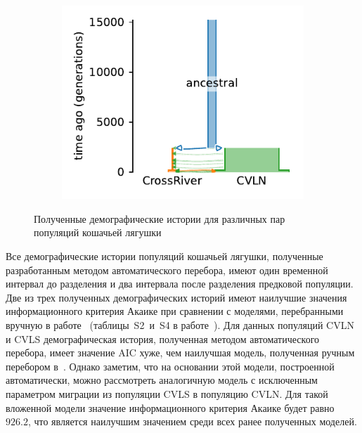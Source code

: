 \begin{figure}[ht]
\begin{subfigure}[b]{.33\textwidth}
    \end{subfigure}%
    \begin{subfigure}[b]{.33\textwidth}
    \includegraphics[width=\textwidth]{images_experiments/gaboon_forest_frog/auto/picture_1pop_model_cross_cvln.pdf}
    \label{fig:part3:experiments:frog:results_3}
    \end{subfigure}
    \caption{Полученные демографические истории для  различных пар популяций кошачьей лягушки}
    \label{fig:part3:experiments:frog:results}
\end{figure}

Все демографические истории популяций кошачьей лягушки, полученные разработанным методом автоматического перебора, имеют один временной интервал до разделения и два интервала после разделения предковой популяции.
Две из трех полученных демографических историй имеют наилучшие значения информационного критерия Акаике при сравнении с моделями, перебранными вручную в работе~\cite{portik2017evaluating} (таблицы~S2~и~S4 в работе~\cite{noskova2020gadma}).
Для данных популяций CVLN и CVLS демографическая история, полученная методом автоматического перебора, имеет значение AIC хуже, чем наилучшая модель, полученная ручным перебором в~\cite{portik2017evaluating}.
Однако заметим, что на основании этой модели, построенной автоматически, можно рассмотреть аналогичную модель с исключенным параметром миграции из популяции CVLS в популяцию CVLN.
Для такой вложенной модели значение информационного критерия Акаике будет равно $926.2$, что является наилучшим значением среди всех ранее полученных моделей.


